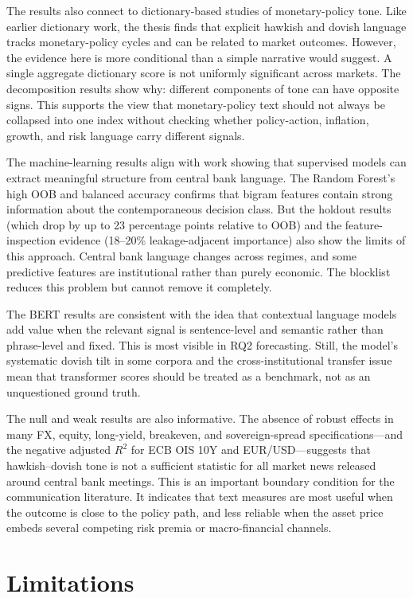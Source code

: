 The results also connect to dictionary-based studies of monetary-policy tone.
Like earlier dictionary work, the thesis finds that explicit hawkish and dovish
language tracks monetary-policy cycles and can be related to market outcomes.
However, the evidence here is more conditional than a simple narrative would
suggest. A single aggregate dictionary score is not uniformly significant across
markets. The decomposition results show why: different components of tone can
have opposite signs. This supports the view that monetary-policy text should not
always be collapsed into one index without checking whether policy-action,
inflation, growth, and risk language carry different signals.

The machine-learning results align with work showing that supervised models can
extract meaningful structure from central bank language. The Random Forest's
high OOB and balanced accuracy confirms that bigram features contain strong
information about the contemporaneous decision class. But the holdout results
(which drop by up to 23 percentage points relative to OOB) and the
feature-inspection evidence (18--20\% leakage-adjacent importance) also show
the limits of this approach. Central bank language changes across regimes, and
some predictive features are institutional rather than purely economic. The
blocklist reduces this problem but cannot remove it completely.

The BERT results are consistent with the idea that contextual language
models add value when the relevant signal is sentence-level and semantic rather
than phrase-level and fixed. This is most visible in RQ2 forecasting. Still, the
model's systematic dovish tilt in some corpora and the cross-institutional
transfer issue mean that transformer scores should be treated as a benchmark,
not as an unquestioned ground truth.

The null and weak results are also informative. The absence of robust effects in
many FX, equity, long-yield, breakeven, and sovereign-spread specifications---and
the negative adjusted $R^2$ for ECB OIS 10Y and EUR/USD---suggests that
hawkish--dovish tone is not a sufficient statistic for all market news released
around central bank meetings. This is an important boundary condition for the
communication literature. It indicates that text measures are most useful when
the outcome is close to the policy path, and less reliable when the asset price
embeds several competing risk premia or macro-financial channels.

\section{Limitations}
\label{sec:disc_limitations}

